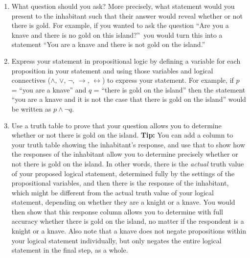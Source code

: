 \documentclass[12pt]{article}
\newcommand{\AND}{\wedge}
\newcommand{\OR}{\vee}
\newcommand{\NOT}{\neg}
\newcommand{\IMPLIES}{\rightarrow}
\newcommand{\IFF}{\leftrightarrow}
\begin{document}
	\begin{enumerate}
		\item What question should you ask?  More precisely, what statement would you present to the inhabitant such that their answer would reveal whether or not there is gold.   For example, if you wanted to ask the question ``Are you a knave and there is no gold on this island?''~you would turn this into a statement ``You are a knave and there is not gold on the island.''
		\item Express your statement in propositional logic by defining a variable for each proposition in your statement and using those variables and logical connectives ($\AND$, $\OR$, $\NOT$, $\IMPLIES$, $\IFF$) to express your statement.   For example, if $p$ = ``you are a knave'' and $q$  = ``there is gold on the island'' then the statement  ``you are a knave and it is not the case that there is gold on the island'' would be written as $p \wedge \NOT q$.
        \item Use a truth table to prove that your question allows you to determine whether or not there is gold on the island. \textbf{Tip:} You can add a column to your truth table showing the inhabitant's response, and use that to show how the responses of the inhabitant allow you to determine precisely whether or not there is gold on the island. In other words, there is the \textit{actual} truth value of your proposed logical statement, determined fully by the settings of the propositional variables, and then there is the response of the inhabitant, which might be different from the actual truth value of your logical statement, depending on whether they are a knight or a knave. You would then show that this response column allows you to determine with full accuracy whether there is gold on the island, no matter if the respondent is a knight or a knave. Also note that a knave does not negate propositions within your logical statement individually, but only negates the entire logical statement in the final step, as a whole. 
	\end{enumerate}
\end{document}
